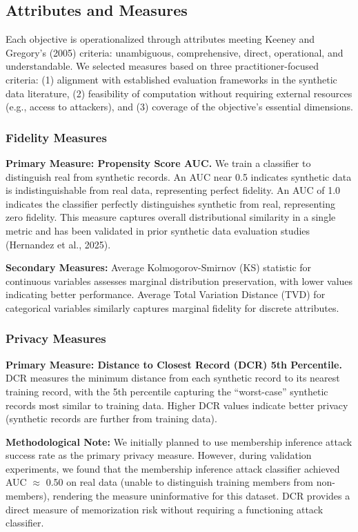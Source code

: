 \documentclass[12pt,a4paper]{article}
\begin{document}
\subsection{Attributes and Measures}

Each objective is operationalized through attributes meeting Keeney and Gregory's (2005) criteria: unambiguous, comprehensive, direct, operational, and understandable. We selected measures based on three practitioner-focused criteria: (1) alignment with established evaluation frameworks in the synthetic data literature, (2) feasibility of computation without requiring external resources (e.g., access to attackers), and (3) coverage of the objective's essential dimensions.

\subsubsection{Fidelity Measures}

\textbf{Primary Measure: Propensity Score AUC.} We train a classifier to distinguish real from synthetic records. An AUC near 0.5 indicates synthetic data is indistinguishable from real data, representing perfect fidelity. An AUC of 1.0 indicates the classifier perfectly distinguishes synthetic from real, representing zero fidelity. This measure captures overall distributional similarity in a single metric and has been validated in prior synthetic data evaluation studies (Hernandez et al., 2025).

\textbf{Secondary Measures:} Average Kolmogorov-Smirnov (KS) statistic for continuous variables assesses marginal distribution preservation, with lower values indicating better performance. Average Total Variation Distance (TVD) for categorical variables similarly captures marginal fidelity for discrete attributes.

\subsubsection{Privacy Measures}

\textbf{Primary Measure: Distance to Closest Record (DCR) 5th Percentile.} DCR measures the minimum distance from each synthetic record to its nearest training record, with the 5th percentile capturing the ``worst-case'' synthetic records most similar to training data. Higher DCR values indicate better privacy (synthetic records are further from training data).

\textbf{Methodological Note:} We initially planned to use membership inference attack success rate as the primary privacy measure. However, during validation experiments, we found that the membership inference attack classifier achieved AUC $\approx$ 0.50 on real data (unable to distinguish training members from non-members), rendering the measure uninformative for this dataset. DCR provides a direct measure of memorization risk without requiring a functioning attack classifier.
\end{document}
